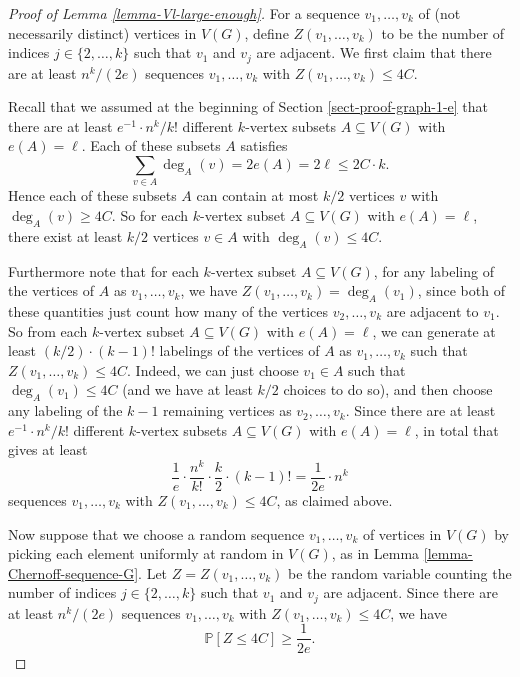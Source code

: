 \documentclass[11pt]{article}
\theoremstyle{definition}
\numberwithin{equation}{section}
\begin{document}
\begin{proof}[Proof of Lemma \ref{lemma-Vl-large-enough}]
For a sequence $v_1,\dots, v_k$ of (not necessarily distinct) vertices in $V(G)$, define $Z(v_1,\dots,v_k)$ to be the number of indices $j\in \lbrace 2,\dots,k\rbrace$ such that $v_1$ and $v_j$ are adjacent. We first claim that there are at least $n^k/(2e)$ sequences $v_1,\dots, v_k$ with $Z(v_1,\dots,v_k)\leq 4C$.

Recall that we assumed at the beginning of Section \ref{sect-proof-graph-1-e} that there are at least $e^{-1}\cdot n^k/k!$ different $k$-vertex subsets $A\subseteq V(G)$ with $e(A)=\ell$. Each of these subsets $A$ satisfies
\[\sum_{v\in A}\deg_A(v)=2e(A)=2\ell\leq 2C\cdot k.\]
Hence each of these subsets $A$ can contain at most $k/2$ vertices $v$ with $\deg_A(v)\geq 4C$. So for each $k$-vertex subset $A\subseteq V(G)$ with $e(A)=\ell$, there exist at least $k/2$ vertices $v\in A$ with $\deg_A(v)\leq 4C$.

Furthermore note that for each $k$-vertex subset $A\subseteq V(G)$, for any labeling of the vertices of $A$ as $v_1,\dots,v_k$, we have $Z(v_1,\dots,v_k)=\deg_A(v_1)$, since both of these quantities just count how many of the vertices $v_2,\dots,v_k$ are adjacent to $v_1$. So from each $k$-vertex subset $A\subseteq V(G)$ with $e(A)=\ell$, we can generate at least $(k/2)\cdot (k-1)!$ labelings of the vertices of $A$ as $v_1,\dots,v_k$ such that $Z(v_1,\dots,v_k)\leq 4C$. Indeed, we can just choose $v_1\in A$ such that $\deg_A(v_1)\leq 4C$ (and we have at least $k/2$ choices to do so), and then choose any labeling of the $k-1$ remaining vertices as $v_2,\dots,v_k$. Since there are at least $e^{-1}\cdot n^k/k!$ different $k$-vertex subsets $A\subseteq V(G)$ with $e(A)=\ell$, in total that gives at least
\[\frac{1}{e}\cdot \frac{n^k}{k!}\cdot \frac{k}{2}\cdot (k-1)!=\frac{1}{2e}\cdot n^k\]
sequences $v_1,\dots, v_k$ with $Z(v_1,\dots,v_k)\leq 4C$, as claimed above.

Now suppose that we choose a random sequence $v_1,\dots,v_k$ of vertices in $V(G)$ by picking each element uniformly at random in $V(G)$, as in Lemma \ref{lemma-Chernoff-sequence-G}. Let $Z=Z(v_1,\dots,v_k)$ be the random variable counting the number of indices $j\in \lbrace 2,\dots,k\rbrace$ such that $v_1$ and $v_j$ are adjacent. Since there are at least $n^k/(2e)$ sequences $v_1,\dots, v_k$ with $Z(v_1,\dots,v_k)\leq 4C$, we have
\begin{equation}\label{ineq-prob-Z-4C-1}
\mathbb{P}[Z\leq 4C]\geq \frac{1}{2e}.
\end{equation}


\end{proof}
\end{document}
